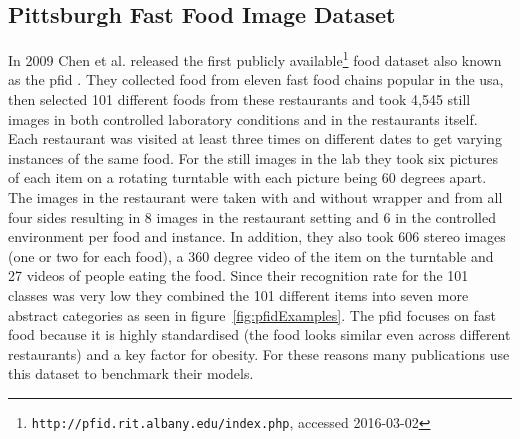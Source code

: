 \subsection[PFID]{Pittsburgh Fast Food Image Dataset}
\label{subsec:relWork_Datasets_pfid}
In 2009 Chen et al. released the first publicly available\footnote{\texttt{http://pfid.rit.albany.edu/index.php}, accessed 2016-03-02} food dataset also known as the \gls{pfid} \cite{Chen2009}. They collected food from eleven fast food chains popular in the \gls{usa}, then selected 101 different foods from these restaurants and took 4,545 still images in both controlled laboratory conditions and in the restaurants itself. Each restaurant was visited at least three times on different dates to get varying instances of the same food. For the still images in the lab they took six pictures of each item on a rotating turntable with each picture being 60 degrees apart. The images in the restaurant were taken with and without wrapper and from all four sides resulting in 8 images in the restaurant setting and 6 in the controlled environment per food and instance. In addition, they also took 606 stereo images {(one or two for each food)}, a 360 degree video of the item on the turntable and 27 videos of people eating the food. Since their recognition rate for the 101 classes was very low they combined the 101 different items into seven more abstract categories as seen in figure~\ref{fig:pfidExamples}. The \gls{pfid} focuses on fast food because it is highly standardised {(the food looks similar even across different restaurants)} and a key factor for obesity. For these reasons many publications use this dataset to benchmark their models.
